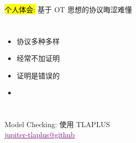 
\begin{frame}{}
  \centerline{\large \hl{个人体会:} 基于 OT 思想的协议晦涩难懂}

  \vspace{0.60cm}
  \begin{columns}
      \pause
      \begin{itemize}
	\setlength{\itemsep}{10pt}
	\centering
	\item 协议多种多样
	\item 经常不加证明
	\item 证明是错误的
	\item<3-> \hl{}
      \end{itemize}
  \end{columns}
\end{frame}

\begin{frame}{}
  \begin{center}
    {\large 
      Model Checking: 使用 TLAPLUS \\[5pt]
      \href{https://github.com/Disalg-ICS-NJU/tlaplus-lamport-projects/tree/master/tlaplus-projects/Hengfeng-Wei/Wei-jupiter-tla}{\textcolor{purple}{\underline{jupiter-tlaplus@github}}}
    }
  \end{center}

  \begin{columns}
      \vspace{-0.50cm}
    \pause
  \end{columns}
\end{frame}

